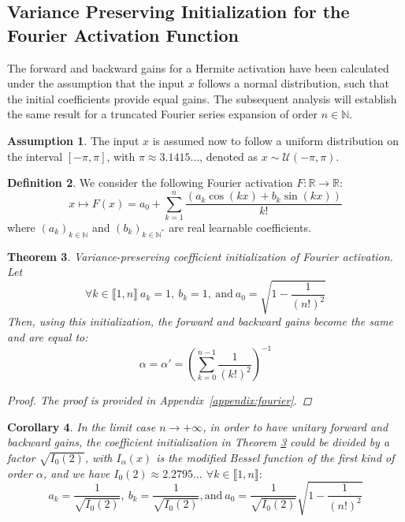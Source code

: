 \documentclass{article} %
\theoremstyle{plain}
\newtheorem{theorem}{Theorem}[section]
\newtheorem{corollary}[theorem]{Corollary}
\theoremstyle{definition}
\newtheorem{definition}[theorem]{Definition}
\newtheorem{assumption}[theorem]{Assumption}
\theoremstyle{remark}
\begin{document}
\subsection{Variance Preserving Initialization for the Fourier Activation Function}
The forward and backward gains for a Hermite activation have been calculated under the assumption that the input $x$ follows a normal distribution, such that the initial coefficients provide equal gains. The subsequent analysis will establish the same result for a truncated Fourier series expansion of order $n \in \mathbb{N}$. 
\begin{assumption}
    The input \( x \) is assumed now to follow a uniform distribution on the interval \( [-\pi, \pi] \), with $\pi\approx3.1415 \ldots$,  denoted as $x \sim \mathcal{U}\left(-\pi, \pi\right)$.
\end{assumption}
\begin{definition}
\label{def:fourier_main}
We consider the following Fourier activation $F \colon  \mathbb{R} \to \mathbb{R}$:
\begin{equation}
\label{eq:fourier}
    x \mapsto F(x) = a_0 +
    \sum_{k=1}^{n} \frac{\left(a_k \cos(k x) + b_k \sin(k x)\right)}{k!}
\end{equation}
where \( (a_k)_{k \in \mathbb{N}} \) and \( (b_k)_{k \in \mathbb{N}^*} \) are real learnable coefficients.
\end{definition}
\begin{theorem}
\label{thm:fourier}
Variance-preserving coefficient initialization of Fourier activation. Let 
\begin{equation}
     \forall k \in \llbracket 1,n \rrbracket \ a_k = 1, \ b_k = 1, \ \text{and}\ a_0 = \sqrt{1 - \frac{1}{(n!)^2}}
\end{equation}
Then, using this initialization, the forward and backward gains become the same and are equal to:
\begin{equation}
    \alpha = \alpha' = \left(\sum_{k=0}^{n-1} \frac{1}{(k!)^2}\right)^{-1}
\end{equation}
\begin{proof}
    The proof is provided in Appendix~\ref{appendix:fourier}.
\end{proof}
\end{theorem}
\begin{corollary}
\label{coro:fourier}
In the limit case $n \to +\infty$, in order to have unitary forward and backward gains, the coefficient initialization in Theorem \ref{thm:fourier} could be divided by a factor $\sqrt{I_0(2)}$, with $I_\alpha(x)$ is the modified Bessel function of the first kind of order $\alpha$, and we have $I_0(2)\approx2.2795\ldots$ $\forall k \in \llbracket 1,n \rrbracket:$
    \begin{equation}
      a_k = \frac{1}{\sqrt{I_0(2)}}, \ b_k = \frac{1}{\sqrt{I_0(2)}}, \text{and} \ a_0 = \frac{1}{\sqrt{I_0(2)}} 
      \sqrt{1 - \frac{1}{(n!)^2}}
    \end{equation}
\end{corollary}
\end{document}
